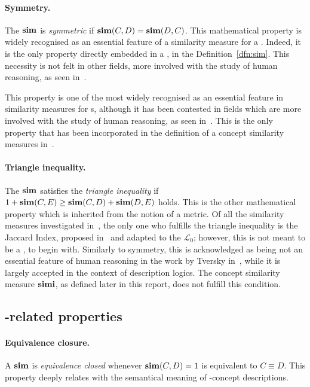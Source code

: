 \paragraph{Symmetry.}
The \csm \(\operatorname{\mathbf{sim}}\) is \emph{symmetric} if \(\operatorname{\mathbf{sim}}(C,D) = \operatorname{\mathbf{sim}}(D,C)\).
This mathematical property is widely recognised as an essential feature of a similarity measure for a \dl.
Indeed, it is the only property directly embedded in a \csm, in the Definition~\ref{dfn:sim}.
This necessity is not felt in other fields, more involved with the study of human reasoning, as seen in~\cite{Tve77}.

This property is one of the most widely recognised as an essential feature in similarity measures for \dl{}s, although it has been contested in fields which are more involved with the study of human reasoning, as seen in~\cite{Tve77}.
This is the only property that has been incorporated in the definition of a concept similarity measures in~\cite{LeTu12}.

\paragraph{Triangle inequality.}
The \csm \(\operatorname{\mathbf{sim}}\) satisfies the \emph{triangle inequality} if \(1 + \operatorname{\mathbf{sim}}(C,E) \ge \operatorname{\mathbf{sim}}(C,D) + \operatorname{\mathbf{sim}}(D,E)\) holds.
This is the other mathematical property which is inherited from the notion of a metric.
Of all the similarity measures investigated in~\cite{LeTu12}, the only one who fulfills the triangle inequality is the Jaccard Index, proposed in~\cite{Ja01} and adapted to the \dl \(\mathcal{L}_0\); however, this is not meant to be a \csm, to begin with.
Similarly to symmetry, this is  acknowledged as being not an essential feature of human reasoning in the work by Tversky in~\cite{Tve77}, while it is largely accepted in the context of description logics.
The concept similarity measure \(\operatorname{\mathbf{simi}}\), as defined later in this report, does not fulfill this condition.

\subsection{\dl-related properties}

\paragraph{Equivalence closure.}
A \csm \(\operatorname{\mathbf{sim}}\) is \emph{equivalence closed} whenever \(\operatorname{\mathbf{sim}}(C,D) = 1\) is equivalent to \(C \equiv D\).
This property deeply relates with the semantical meaning of \elh-concept descriptions.

